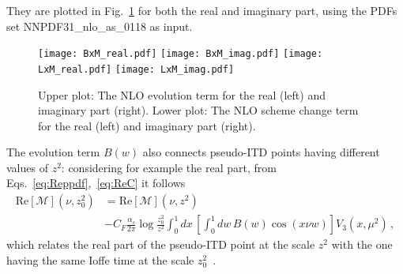 They are plotted in Fig.~\ref{fig::BL} for both the real and imaginary part, using the PDFs set 
NNPDF31\_nlo\_as\_0118 as input.
\begin{figure}[h!]
    \center
    \texttt{[image: BxM\_real.pdf]}
    \texttt{[image: BxM\_imag.pdf]}
    \texttt{[image: LxM\_real.pdf]}
    \texttt{[image: LxM\_imag.pdf]}
    \caption{Upper plot: The NLO evolution term for the real (left) and imaginary part (right). 
    Lower plot: The NLO scheme change term for the real (left) and imaginary part (right).}
    \label{fig::BL}
\end{figure}
The evolution term $B\left(w\right)$ also connects pseudo-ITD points having different values of $z^2$: 
considering for example the real part, from Eqs.~\eqref{eq:Reppdf},~\eqref{eq:ReC} it follows
\begin{align}
    \label{eq::evolRe}
        \text{Re}\left[\mathcal{M}\right]\left(\nu, z_0^2\right) &= 
        \text{Re}\left[\mathcal{M}\right]\left(\nu, z^2\right) \nonumber\\ 
        &- C_F \frac{\alpha_s}{2\pi}\log\frac{z_0^2}{z^2} 
		\int_{0}^{1} dx\,\left[\int_0^1 dw \,B\left(w\right)  \cos\left(x\nu w\right)\right] 
		V_3\left(x,\mu^2\right)\,,
\end{align}
which relates the real part of the pseudo-ITD point at the scale $z^2$ with the one
having the same Ioffe time at the scale $z_0^2$~\cite{Orginos:2017kos,Karpie:2017bzm}. 

